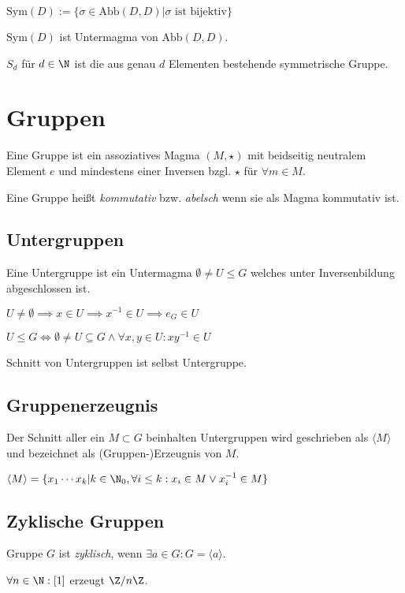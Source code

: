 $\text{Sym}(D) := \{ \sigma \in \text{Abb}(D,D) | \sigma \text{ ist bijektiv}\}$

$\text{Sym}(D)$ ist Untermagma von $\text{Abb}(D,D)$.

$S_d$ für $d \in \N$ ist die aus genau $d$ Elementen bestehende symmetrische Gruppe.

\section*{Gruppen}

Eine Gruppe ist ein assoziatives Magma $(M, \star)$ mit beidseitig neutralem Element $e$ und mindestens einer Inversen bzgl. $\star$ für $\forall m \in M$.

Eine Gruppe heißt \emph{kommutativ} bzw. \emph{abelsch} wenn sie als Magma kommutativ ist.

\subsection*{Untergruppen}

Eine Untergruppe ist ein Untermagma $\emptyset \neq U \leq G$ welches unter Inversenbildung abgeschlossen ist.

$U \neq \emptyset \implies x \in U \implies x^{-1} \in U \implies e_G \in U$

$U \leq G \iff \emptyset \neq U \subseteq G \land \forall x, y \in U : xy^{-1} \in U$

Schnitt von Untergruppen ist selbst Untergruppe.

\subsection*{Gruppenerzeugnis}

Der Schnitt aller ein $M \subset G$ beinhalten Untergruppen wird geschrieben als $\langle M \rangle$ und bezeichnet als (Gruppen-)Erzeugnis von $M$.

$\langle M \rangle = \{ x_1 \cdots x_k | k \in \N_0, \forall i \leq k : x_i \in M \lor x_i^{-1} \in M \}$

\subsection*{Zyklische Gruppen}

Gruppe $G$ ist \emph{zyklisch}, wenn $\exists a \in G : G = \langle a \rangle$.

$\forall n \in \N : [1]$ erzeugt $\Z / n\Z$.

